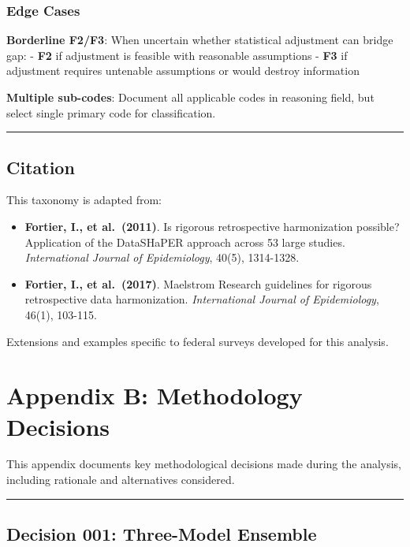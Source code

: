 \documentclass[
  letterpaper,
]{report}
\begin{document}
\subsection{Edge Cases}\label{edge-cases}

\textbf{Borderline F2/F3}: When uncertain whether statistical adjustment
can bridge gap: - \textbf{F2} if adjustment is feasible with reasonable
assumptions - \textbf{F3} if adjustment requires untenable assumptions
or would destroy information

\textbf{Multiple sub-codes}: Document all applicable codes in reasoning
field, but select single primary code for classification.

\begin{center}\rule{0.5\linewidth}{0.5pt}\end{center}

\section{Citation}\label{citation}

This taxonomy is adapted from:

\begin{itemize}
\item
  \textbf{Fortier, I., et al.~(2011)}. Is rigorous retrospective
  harmonization possible? Application of the DataSHaPER approach across
  53 large studies. \emph{International Journal of Epidemiology}, 40(5),
  1314-1328.
\item
  \textbf{Fortier, I., et al.~(2017)}. Maelstrom Research guidelines for
  rigorous retrospective data harmonization. \emph{International Journal
  of Epidemiology}, 46(1), 103-115.
\end{itemize}

Extensions and examples specific to federal surveys developed for this
analysis.

\chapter{Appendix B: Methodology
Decisions}\label{appendix-b-methodology-decisions}

This appendix documents key methodological decisions made during the
analysis, including rationale and alternatives considered.

\begin{center}\rule{0.5\linewidth}{0.5pt}\end{center}

\section{Decision 001: Three-Model
Ensemble}\label{decision-001-three-model-ensemble}
\end{document}

